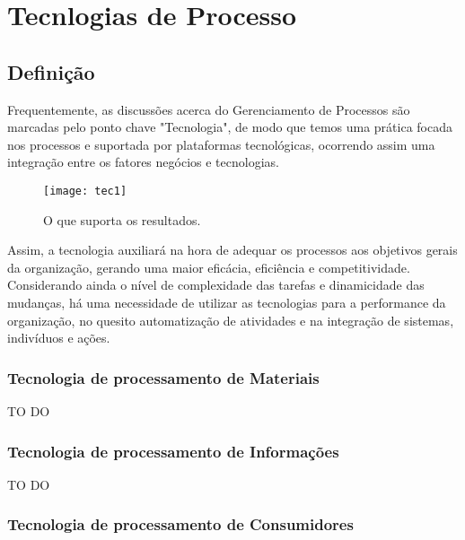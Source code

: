 \chapter[Tecnlogias de Processo]{Tecnlogias de Processo}
\label{chap:tecnologias}
	
	\section[Definição]{Definição}
	\label{sec:tecnologias_definicao}

		Frequentemente, as discussões acerca do Gerenciamento de Processos são marcadas pelo ponto chave "Tecnologia", de modo que temos uma prática focada nos processos e suportada por plataformas tecnológicas, ocorrendo assim uma integração entre os fatores negócios e tecnologias. 

		\begin{figure}[h]
			\centering
			\texttt{[image: tec1]}
			\caption[O que suporta os resultados]{O que suporta os resultados.}
			\label{fig:suporta_resultados}
		\end{figure}


		Assim, a tecnologia auxiliará na hora de adequar os processos aos objetivos gerais da organização, gerando uma maior eficácia, eficiência e competitividade. Considerando ainda o nível de complexidade das tarefas e dinamicidade das mudanças, há uma necessidade de utilizar as tecnologias para a performance da organização, no quesito automatização de atividades e na integração de sistemas, indivíduos e ações.

		\subsection[Tecnologia de processamento de Materiais]{Tecnologia de processamento de Materiais}
		\label{sec:tecnologias_definicao_materiais}

			TO DO

		\subsection[Tecnologia de processamento de Informações]{Tecnologia de processamento de Informações}
		\label{sec:tecnologias_definicao_informacoes}
		
			TO DO

		\subsection[Tecnologia de processamento de Consumidores]{Tecnologia de processamento de Consumidores}
		\label{sec:tecnologias_definicao_consumidores}

